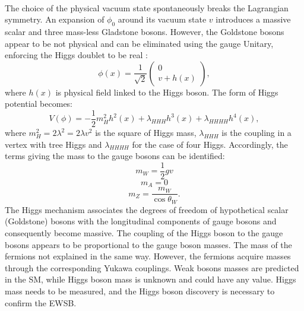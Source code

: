 \\
The choice of the physical vacuum state spontaneously breaks the Lagrangian symmetry. An expansion of $\phi_0$ around its vacuum state $v$ introduces a massive scalar and three mass-less Gladstone bosons. However, the Goldstone bosons appear to be not physical and can be eliminated using the gauge Unitary, enforcing the Higgs doublet to be real :
\begin{equation}
    \phi(x)=\frac{1}{\sqrt{2}}\left(\begin{array}{c}
0 \\
v+h(x)
\end{array}\right),
\end{equation}
where $h(x)$ is physical field linked to the Higgs boson. The form of Higgs potential becomes: \begin{equation}
    V(\phi)=-\frac{1}{2} m_{H}^{2} h^{2}(x)+\lambda_{H H H} h^{3}(x)+\lambda_{H H H H} h^{4}(x),
\end{equation}
where $m_{H}^{2}=2 \lambda^{2}=2 \lambda v^{2}$ is the square of Higgs mass, $\lambda_{HHH}$ is the coupling in a vertex with tree Higgs and $\lambda_{HHHH}$ for the case of four Higgs.
Accordingly, the terms giving the mass to the gauge bosons can be identified:
\begin{equation}
m_{W} = \frac{1}{2}gv 
\end{equation}
\begin{equation}
m_{A} = 0    
\end{equation}
\begin{equation}
m_{Z} = \frac{m_{W}}{\cos\theta_{W}}.
\end{equation}
The Higgs mechanism associates the degrees of freedom of hypothetical scalar (Goldstone) bosons with the longitudinal components of gauge bosons and consequently become massive. The coupling of the Higgs boson to the gauge bosons appears to be proportional to the gauge boson masses. The mass of the fermions not explained in the same way. However, the fermions acquire masses through the corresponding Yukawa couplings.  Weak bosons masses are predicted in the SM, while  Higgs boson mass is unknown and could have any value. Higgs mass needs to be measured, and the Higgs boson discovery is necessary to confirm the EWSB.
